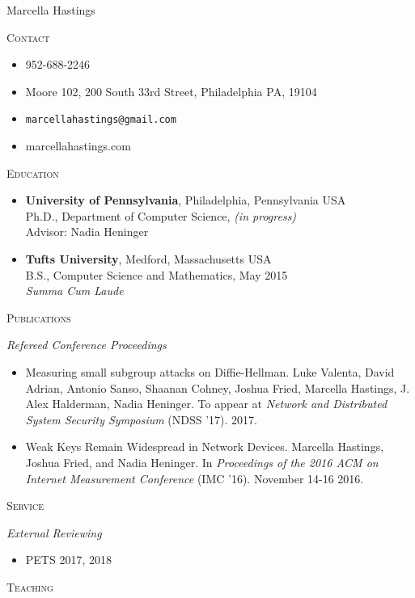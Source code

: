 \documentclass{article}
\begin{document}
Marcella Hastings

\hrulefill

\textsc{Contact}
\begin{itemize}[label={},noitemsep]
  \item 952-688-2246
  \item Moore 102, 200 South 33rd Street, Philadelphia PA, 19104
  \item \texttt{marcellahastings@gmail.com}
  \item marcellahastings.com
\end{itemize}

\textsc{Education}
\begin{itemize}[label={}]
  \item \textbf{University of Pennsylvania}, Philadelphia, Pennsylvania USA \\
    Ph.D., Department of Computer Science, \textit{(in progress)}\\
    Advisor: Nadia Heninger \\
    
  \item \textbf{Tufts University}, Medford, Massachusetts USA \\
    B.S., Computer Science and Mathematics, May 2015 \\
    \textit{Summa Cum Laude}
\end{itemize}

\textsc{Publications}

\textit{Refereed Conference Proceedings}
\begin{itemize}[label={}]
\item Measuring small subgroup attacks on Diffie-Hellman. Luke Valenta, David Adrian, Antonio Sanso, Shaanan Cohney, Joshua Fried, Marcella Hastings, J. Alex Halderman, Nadia Heninger. To appear at \textit{Network and Distributed System Security Symposium} (NDSS '17). 2017.
\item Weak Keys Remain Widespread in Network Devices. Marcella Hastings, Joshua Fried, and Nadia Heninger. In \textit{Proceedings of the 2016 ACM on Internet Measurement Conference} (IMC '16). November 14-16 2016.
\end{itemize}

\textsc{Service}

\textit{External Reviewing}
\begin{itemize}[label={}]
\item PETS 2017, 2018
\end{itemize}

\textsc{Teaching}
\end{document}
